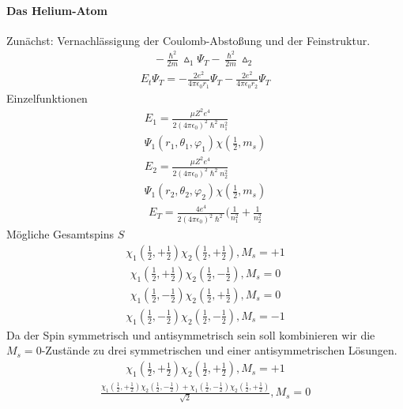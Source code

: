 \documentclass[10pt,a4paper]{article}
\begin{document}
\paragraph{Das Helium-Atom} $\,$ \\
Zunächst: Vernachlässigung der Coulomb-Abstoßung und der Feinstruktur.
\begin{align}
-\frac{\hslash^2}{2m} \vartriangle_1 \Psi_T -\frac{\hslash^2}{2m} \vartriangle_2
\end{align}
\begin{align}
E_t \Psi_T= -\frac{2 e^2}{4 \pi \epsilon_0 r_1} \Psi_T - \frac{2 e^2}{4 \pi \epsilon_0 r_2} \Psi_T
\end{align}
Einzelfunktionen
\begin{align}
E_1= \frac{\mu Z^2 e^4}{2(4 \pi \epsilon_0)^2\hslash^2 n_1^2} \\
\Psi_1 (r_1, \theta_1, \varphi_1) \chi (\frac{1}{2}, m_s)
\end{align}
\begin{align}
E_2=\frac{\mu Z^2 e^4}{2(4 \pi \epsilon_0)^2\hslash^2 n_2^2} \\
\Psi_1 (r_2, \theta_2, \varphi_2) \chi (\frac{1}{2}, m_s)
\end{align}
\begin{align}
E_T= \frac{ 4 e^4}{2(4 \pi \epsilon_0)^2\hslash^2} (\frac{1}{n_1^2}+\frac{1}{n_2^2}
\end{align}
Mögliche Gesamtspins $S$
\begin{align}
\chi_1(\frac{1}{2}, +\frac{1}{2}) \chi_2(\frac{1}{2}, +\frac{1}{2}), M_s=+1
\end{align}
\begin{align}
\chi_1(\frac{1}{2}, +\frac{1}{2}) \chi_2(\frac{1}{2}, -\frac{1}{2}), M_s=0
\end{align}
\begin{align}
\chi_1(\frac{1}{2}, -\frac{1}{2}) \chi_2(\frac{1}{2}, +\frac{1}{2}), M_s=0
\end{align}
\begin{align}
\chi_1(\frac{1}{2}, -\frac{1}{2}) \chi_2(\frac{1}{2}, -\frac{1}{2}), M_s=-1
\end{align}
Da der Spin symmetrisch und antisymmetrisch sein soll kombinieren wir die $M_s=0$-Zustände zu drei symmetrischen und einer antisymmetrischen Lösungen.
\begin{align}
\chi_1(\frac{1}{2}, +\frac{1}{2}) \chi_2(\frac{1}{2}, +\frac{1}{2}), M_s=+1
\end{align}
\begin{align}
\frac{\chi_1(\frac{1}{2}, +\frac{1}{2}) \chi_2(\frac{1}{2}, -\frac{1}{2}) + \chi_1(\frac{1}{2}, -\frac{1}{2}) \chi_2(\frac{1}{2}, +\frac{1}{2})}{\sqrt{2}} , M_s=0
\end{align}
\end{document}
